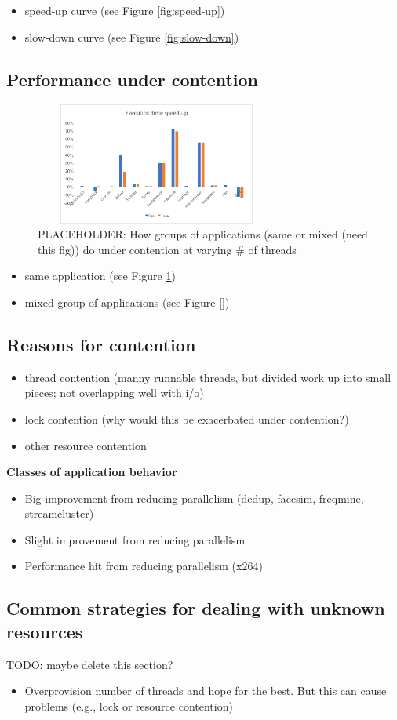 \begin{itemize}
  \item speed-up curve (see Figure \ref{fig:speed-up})
  \item slow-down curve (see Figure \ref{fig:slow-down})
\end{itemize}

\subsection{Performance under contention}

\begin{figure}
\centering
  \includegraphics[width=8cm,height=4cm]{fig/contention-same.png}
  \caption{PLACEHOLDER: How groups of applications (same or mixed (need this fig)) do under contention at varying \# of threads}
  \label{fig:contention-same}
\end{figure}

\begin{itemize}
  \item same application (see Figure \ref{fig:contention-same})
  \item mixed group of applications (see Figure [])
\end{itemize}

\subsection{Reasons for contention}
\begin{itemize}
  \item thread contention (manny runnable threads, but divided work up into small pieces; not overlapping well with i/o)
  \item lock contention (why would this be exacerbated under contention?)
  \item other resource contention
\end{itemize}

\textbf{Classes of application behavior}
\begin{itemize}
  \item Big improvement from reducing parallelism (dedup, facesim, freqmine, streamcluster)
  \item Slight improvement from reducing parallelism
  \item Performance hit from reducing parallelism (x264)
\end{itemize}

\subsection{Common strategies for dealing with unknown resources}
TODO: maybe delete this section?
\begin{itemize}
  \item Overprovision number of threads and hope for the best. But this can cause problems (e.g., lock or resource contention)
\end{itemize}
